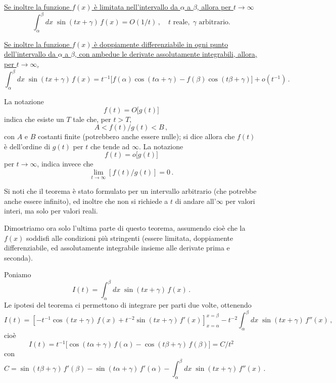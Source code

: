 \documentclass[11pt, a4paper]{book}
\numberwithin{equation}{section}
\begin{document}
\uline{Se inoltre la funzione $f(x)$ è limitata nell'intervallo da $\alpha$ a $\beta$, allora per $t\to\infty$}
\begin{equation}
  \int_\alpha^\beta dx\;\sin(tx+\gamma)\,f(x) = O(1/t)\,,
  \quad t \text{ reale},\; \gamma \text{ arbitrario.} \tag{5}
\end{equation}

\uline{Se inoltre la funzione $f(x)$ è doppiamente differenziabile in ogni punto dell'intervallo da $\alpha$ a $\beta$, con ambedue le derivate assolutamente integrabili, allora, per $t\to\infty$,}
\begin{equation}
  \int_\alpha^\beta dx\;\sin(tx+\gamma)\,f(x)
  = t^{-1}\bigl[f(\alpha)\cos(t\alpha+\gamma) - f(\beta)\cos(t\beta+\gamma)\bigr]
  + o(t^{-1})\,. \tag{6}
\end{equation}

La notazione
\[
  f(t) = O\bigl[g(t)\bigr]
\]
indica che esiste un $T$ tale che, per $t > T$,
\[
  A < f(t)/g(t) < B\,,
\]
con $A$ e $B$ costanti finite (potrebbero anche essere nulle); si dice allora che $f(t)$ è dell'ordine di $g(t)$ per $t$ che tende ad $\infty$. La notazione
\[
  f(t) = o\bigl[g(t)\bigr]
\]
per $t\to\infty$, indica invece che
\[
  \lim_{t\to\infty}\left[f(t)/g(t)\right] = 0\,.
\]

Si noti che il teorema è stato formulato per un intervallo arbitrario (che potrebbe anche essere infinito), ed inoltre che non si richiede a $t$ di andare all'$\infty$ per valori interi, ma solo per valori reali.

Dimostriamo ora solo l'ultima parte di questo teorema, assumendo cioè che la $f(x)$ soddisfi alle condizioni più stringenti (essere limitata, doppiamente differenziabile, ed assolutamente integrabile insieme alle derivate prima e seconda).

Poniamo
\begin{equation}
  I(t) = \int_\alpha^\beta dx\;\sin(tx+\gamma)\,f(x)\,. \tag{7}
\end{equation}
Le ipotesi del teorema ci permettono di integrare per parti due volte, ottenendo
\begin{equation}
  I(t) = \left[-t^{-1}\cos(tx+\gamma)\,f(x) + t^{-2}\sin(tx+\gamma)\,f'(x)\right]_{x=\alpha}^{x=\beta}
  - t^{-2}\int_\alpha^\beta dx\;\sin(tx+\gamma)\,f''(x)\,, \tag{8a}
\end{equation}
cioè
\begin{equation}
  I(t) = t^{-1}\bigl[\cos(t\alpha+\gamma)\,f(\alpha) - \cos(t\beta+\gamma)\,f(\beta)\bigr]
  = C/t^2 \tag{8b}
\end{equation}
con
\begin{equation}
  C = \sin(t\beta+\gamma)\,f'(\beta) - \sin(t\alpha+\gamma)\,f'(\alpha)
  - \int_\alpha^\beta dx\;\sin(tx+\gamma)\,f''(x)\,. \tag{9}
\end{equation}
\end{document}
